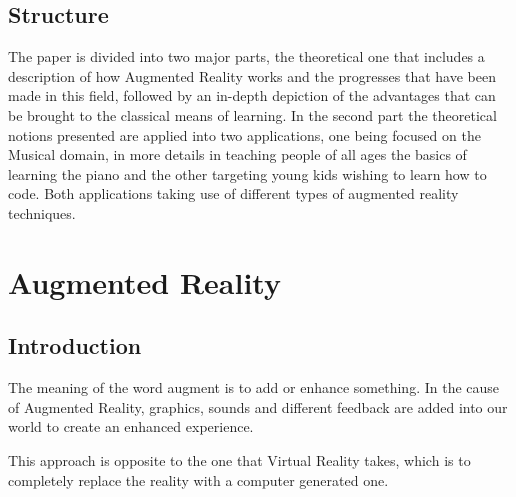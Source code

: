 \documentclass[12 pct]{report}
\begin{document}
\section{Structure}
The paper is divided into two major parts, the theoretical one that includes a description of how Augmented Reality works and the progresses that have been made in this field, followed by an in-depth depiction of the advantages that can be brought to the classical means of learning. In the second part the theoretical notions presented are applied into two applications, one being focused on the Musical domain, in more details in teaching people of all ages the basics of learning the piano and the other targeting young kids wishing to learn how to code. Both applications taking use of different types of augmented reality techniques.
\chapter{Augmented Reality}

\section{Introduction}
The meaning of the word augment is to add or enhance something. In the cause of Augmented Reality, graphics, sounds and different feedback are added into our world to create an enhanced experience.

This approach is opposite to the one that Virtual Reality takes, which is to completely replace the reality with a computer generated one.
\end{document}

